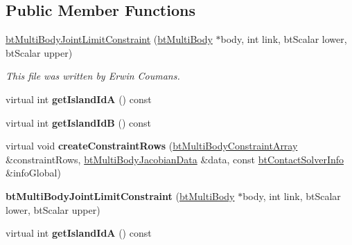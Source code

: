 \subsection*{Public Member Functions}
\begin{DoxyCompactItemize}
\item 
\mbox{\label{classbtMultiBodyJointLimitConstraint_af582f794235694f229618cc0e948bca5}} 
\hyperlink{classbtMultiBodyJointLimitConstraint_af582f794235694f229618cc0e948bca5}{bt\+Multi\+Body\+Joint\+Limit\+Constraint} (\hyperlink{classbtMultiBody}{bt\+Multi\+Body} $\ast$body, int link, bt\+Scalar lower, bt\+Scalar upper)
\begin{DoxyCompactList}\small\item\em This file was written by Erwin Coumans. \end{DoxyCompactList}\item 
\mbox{\label{classbtMultiBodyJointLimitConstraint_aa7065ffda64ef41ce46a5cd7664d303e}} 
virtual int {\bfseries get\+Island\+IdA} () const
\item 
\mbox{\label{classbtMultiBodyJointLimitConstraint_a4d506eb7ea78475119dc03c37dede826}} 
virtual int {\bfseries get\+Island\+IdB} () const
\item 
\mbox{\label{classbtMultiBodyJointLimitConstraint_ac7133523141f1280f4df2f6bff8bdab0}} 
virtual void {\bfseries create\+Constraint\+Rows} (\hyperlink{classbtAlignedObjectArray}{bt\+Multi\+Body\+Constraint\+Array} \&constraint\+Rows, \hyperlink{structbtMultiBodyJacobianData}{bt\+Multi\+Body\+Jacobian\+Data} \&data, const \hyperlink{structbtContactSolverInfo}{bt\+Contact\+Solver\+Info} \&info\+Global)
\item 
\mbox{\label{classbtMultiBodyJointLimitConstraint_af582f794235694f229618cc0e948bca5}} 
{\bfseries bt\+Multi\+Body\+Joint\+Limit\+Constraint} (\hyperlink{classbtMultiBody}{bt\+Multi\+Body} $\ast$body, int link, bt\+Scalar lower, bt\+Scalar upper)
\item 
\mbox{\label{classbtMultiBodyJointLimitConstraint_ac4213d56e22bf214deb43bd60b1dee75}} 
virtual int {\bfseries get\+Island\+IdA} () const

\end{DoxyCompactItemize}

